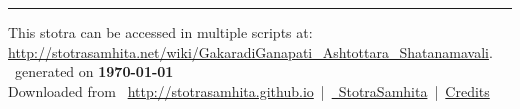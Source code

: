 \documentclass[oneside,12pt]{book}
\begin{document}
\setmainfont[Script=Devanagari,Mapping=tex-text]{Sanskrit 2003}
\fontsize {16}{19.25}\selectfont
\begin{center}

\end{center}
\vfill
\centering
\rule{0.8\textwidth}{0.6pt}

\footnotesize
{}\sffamily
This stotra can be accessed in multiple scripts at:\\
\url{http://stotrasamhita.net/wiki/GakaradiGanapati_Ashtottara_Shatanamavali}.\\[1ex]
\faFilePdfO~generated on \textbf{\today}\\[1ex]
Downloaded from \faGlobe{}~\url{http://stotrasamhita.github.io}~|~\href{https://github.com/StotraSamhita}{\faGithubSquare{}~StotraSamhita}~|~\href{https://stotrasamhita.github.io/about/}{Credits}
\end{document}

